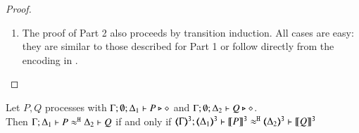 \begin{proof}
\begin{enumerate}
\begin{enumerate}[a)]
	\end{enumerate}

	\item The proof of Part 2 also proceeds by transition induction.
	All cases are easy: they 
	are similar to those described for Part 1
	or
	follow directly from the 
encoding in .
%
%
%
\end{enumerate}
\end{proof}

\begin{proposition}\myrm
	\label{app:prop:fulla_HOpp_to_HOp}
	Let $P, Q$ \HOpp processes with $\Gamma; \emptyset; \Delta_1 \vdash P \triangleright \diamond$ and 
	$\Gamma; \emptyset; \Delta_2 \vdash Q \triangleright \diamond$. \\
	Then 
	$\Gamma; \Delta_1 \vdash P \approx^\mathtt{H} \Delta_2 \vdash Q$ if and only if $\horel{\tmap{\Gamma}{3}}{\tmap{\Delta_1}{3}}{\pmap{P}{3}}{\hwb}{\tmap{\Delta_2}{3}}{\pmap{Q}{3}}$
\end{proposition}


